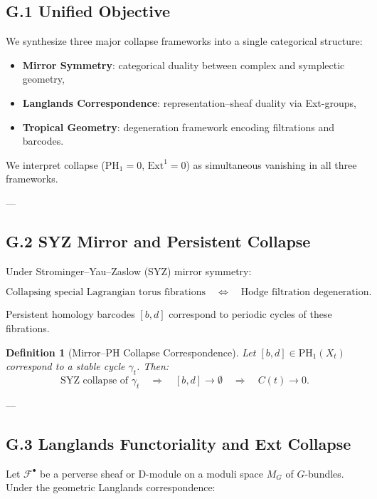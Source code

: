 \documentclass[11pt]{article}
\newtheorem{definition}[theorem]{Definition}
\begin{document}
\subsection*{G.1 Unified Objective}

We synthesize three major collapse frameworks into a single categorical structure:

\begin{itemize}
  \item \textbf{Mirror Symmetry}: categorical duality between complex and symplectic geometry,
  \item \textbf{Langlands Correspondence}: representation–sheaf duality via Ext-groups,
  \item \textbf{Tropical Geometry}: degeneration framework encoding filtrations and barcodes.
\end{itemize}

We interpret collapse ($\mathrm{PH}_1 = 0$, $\mathrm{Ext}^1 = 0$) as simultaneous vanishing in all three frameworks.

---

\subsection*{G.2 SYZ Mirror and Persistent Collapse}

Under Strominger–Yau–Zaslow (SYZ) mirror symmetry:

\[
\text{Collapsing special Lagrangian torus fibrations} 
\quad \Longleftrightarrow \quad 
\text{Hodge filtration degeneration}.
\]

Persistent homology barcodes $[b,d]$ correspond to periodic cycles of these fibrations.

\begin{definition}[Mirror–PH Collapse Correspondence]
Let $[b,d] \in \mathrm{PH}_1(X_t)$ correspond to a stable cycle $\gamma_t$.
Then:
\[
\text{SYZ collapse of } \gamma_t 
\quad \Rightarrow \quad 
[b,d] \to \emptyset \quad \Rightarrow \quad C(t) \to 0.
\]
\end{definition}

---

\subsection*{G.3 Langlands Functoriality and Ext Collapse}

Let $\mathcal{F}^\bullet$ be a perverse sheaf or D-module on a moduli space $M_G$ of $G$-bundles.  
Under the geometric Langlands correspondence:
\end{document}
